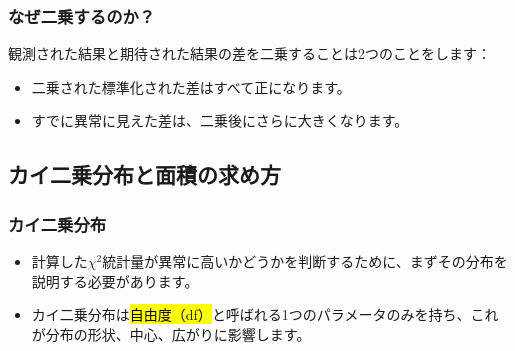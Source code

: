 
\begin{frame}
\frametitle{なぜ二乗するのか？}


観測された結果と期待された結果の差を二乗することは2つのことをします：
\begin{itemize}
\item 二乗された標準化された差はすべて正になります。
\item すでに異常に見えた差は、二乗後にさらに大きくなります。
\end{itemize}

\vspace{1cm}


\end{frame}


\subsection{カイ二乗分布と面積の求め方}


\begin{frame}
\frametitle{カイ二乗分布}

\begin{itemize}

\item 計算した$\chi^2$統計量が異常に高いかどうかを判断するために、まずその分布を説明する必要があります。

\item カイ二乗分布は\hl{自由度（df）}と呼ばれる1つのパラメータのみを持ち、これが分布の形状、中心、広がりに影響します。\\

\end{itemize}

$\:$ \\


\end{frame}

